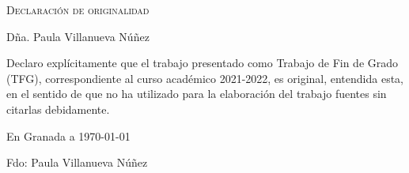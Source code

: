 \newpage
\null
\thispagestyle{empty}
\newpage
\null
\thispagestyle{empty}

\hfill\vfill

\textsc{Declaración de originalidad}\\\bigskip

Dña. Paula Villanueva Núñez \\\medskip

Declaro explícitamente que el trabajo presentado como Trabajo de Fin de Grado (TFG), correspondiente al curso académico 2021-2022, es original, entendida esta, en el sentido de que no ha utilizado para la elaboración del trabajo fuentes sin citarlas debidamente.
\medskip

En Granada a \today
\begin{flushleft}
Fdo: Paula Villanueva Núñez

\end{flushleft}

\vfill

\endinput

